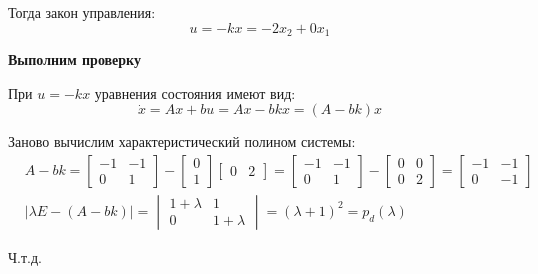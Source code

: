 \noindent Тогда закон управления:
$$ u = -kx = -2x_2 + 0x_1 $$

\textbf{Выполним проверку}

При $ u=-kx $ уравнения состояния имеют вид:
$$ \dot{x}=Ax+bu=Ax-bkx=(A-bk)x $$

\noindent Заново вычислим характеристический полином системы:
\begin{align*}
    &A-bk = \begin{bmatrix}
        -1 & -1 \\ 0 & 1
    \end{bmatrix} - \begin{bmatrix}
        0 \\ 1 
    \end{bmatrix} \begin{bmatrix}
        0 & 2
    \end{bmatrix} = \begin{bmatrix}
        -1 & -1 \\ 0 & 1
    \end{bmatrix} - \begin{bmatrix}
        0 & 0 \\ 0 & 2 
    \end{bmatrix} = \begin{bmatrix}
        -1 & -1 \\ 0 & -1
    \end{bmatrix} \\
    &| \lambda E - (A-bk) | = \begin{vmatrix}
        1+\lambda & 1 \\ 0 & 1+\lambda
    \end{vmatrix} = (\lambda + 1)^2 = p_d(\lambda)
\end{align*}

\noindent Ч.т.д.

